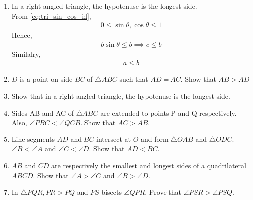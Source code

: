 \begin{enumerate}[label=\thesection.\arabic*.,ref=\thesection.\theenumi]
\item In a right angled triangle, the hypotenuse is the longest side.
\label{them:hyp_largest}
\\
\solution From 
\eqref{eq:tri_sin_cos_id},
\begin{align}
	0 \le \sin \theta, \cos \theta \le 1
\end{align}
Hence, 
\begin{align}
	b \sin \theta \le b \implies  c \le b
\end{align}
Similalry,
\begin{align}
	a \le b
\end{align}
\item $D$ is a point on side $BC$ of $\triangle  ABC$ such that $AD = AC$. Show that $AB > AD$
\item Show that in a right angled triangle, the hypotenuse is the longest side.
\item Sides AB and AC of $\triangle  ABC$ are extended to points P and Q respectively. Also, $\angle  PBC < \angle  QCB$. Show that $AC > AB$.

\item Line segments $AD$ and $BC$ intersect at $O$ and form $\triangle OAB$ and $\triangle ODC$. $\angle  B < \angle  A$ and $\angle  C < \angle  D$. Show that $AD < BC$.

\item $AB$ and $CD$ are respectively the smallest and longest sides of a quadrilateral $ABCD$. Show that $\angle  A > \angle  C$ and $\angle  B > \angle  D$.
%
\item In $\triangle PQR,  PR > PQ$ and $PS$ bisects $\angle  QPR$. Prove that $\angle  PSR > \angle  PSQ$.
\end{enumerate}
